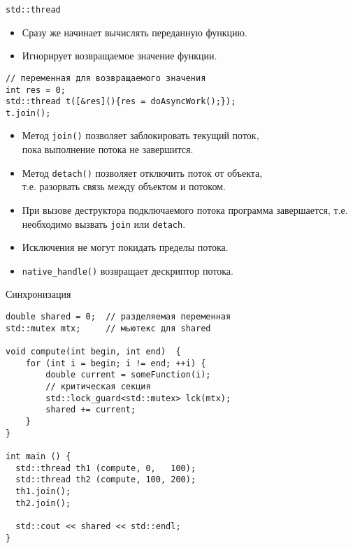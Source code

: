 \documentclass[aspectration=1610,t]{beamer}
\begin{document}
\begin{frame}[fragile]{\texttt{std::thread}}
    \begin{itemize}
        \item Сразу же начинает вычислять переданную функцию.

        \item Игнорирует возвращаемое значение функции.
    \end{itemize}
\begin{lstlisting}
// переменная для возвращаемого значения
int res = 0;
std::thread t([&res](){res = doAsyncWork();});
t.join();
\end{lstlisting}    
       
    \begin{itemize}
        \item Метод \texttt{join()} позволяет заблокировать текущий поток,\\ пока
            выполнение потока не завершится.

        \item Метод \texttt{detach()} позволяет отключить поток от объекта,\\
            т.е. разорвать связь между объектом и потоком.

        \item При вызове деструктора подключаемого потока программа
            завершается, т.е. необходимо вызвать \texttt{join} или \texttt{detach}.

                   
        \item Исключения не могут покидать пределы потока.
        
        
        \item \texttt{native\_handle()} возвращает дескриптор потока.
    \end{itemize}


\end{frame}

\begin{frame}[fragile]{Синхронизация}
    \begin{lstlisting}
double shared = 0;	// разделяемая переменная
std::mutex mtx; 	// мьютекс для shared

void compute(int begin, int end)  {
    for (int i = begin; i != end; ++i) {
        double current = someFunction(i);        
        // критическая секция
        std::lock_guard<std::mutex> lck(mtx);
        shared += current;        
    }
}

int main () {
  std::thread th1 (compute, 0,   100);
  std::thread th2 (compute, 100, 200);
  th1.join();
  th2.join();

  std::cout << shared << std::endl;
}
\end{lstlisting}
\end{frame}
\end{document}
